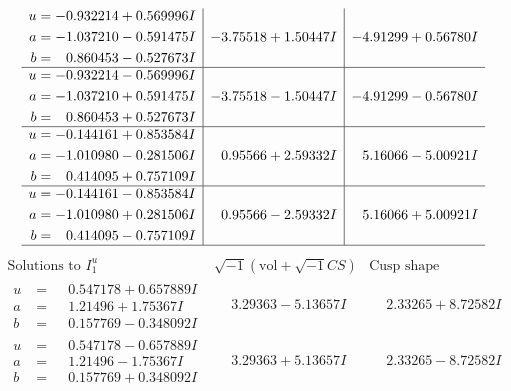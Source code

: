 \documentclass[1p]{elsarticle_modified}
\theoremstyle{definition}
\newcommand{\I}{\sqrt{-1}}
\begin{document}
$$\begin{array}{c|c|c}
\begin{aligned}
u &= -0.932214 + 0.569996 I \\
a &= -1.037210 - 0.591475 I \\
b &= \phantom{-}0.860453 - 0.527673 I\end{aligned}
 & -3.75518 + 1.50447 I & -4.91299 + 0.56780 I \\ \hline\begin{aligned}
u &= -0.932214 - 0.569996 I \\
a &= -1.037210 + 0.591475 I \\
b &= \phantom{-}0.860453 + 0.527673 I\end{aligned}
 & -3.75518 - 1.50447 I & -4.91299 - 0.56780 I \\ \hline\begin{aligned}
u &= -0.144161 + 0.853584 I \\
a &= -1.010980 - 0.281506 I \\
b &= \phantom{-}0.414095 + 0.757109 I\end{aligned}
 & \phantom{-}0.95566 + 2.59332 I & \phantom{-}5.16066 - 5.00921 I \\ \hline\begin{aligned}
u &= -0.144161 - 0.853584 I \\
a &= -1.010980 + 0.281506 I \\
b &= \phantom{-}0.414095 - 0.757109 I\end{aligned}
 & \phantom{-}0.95566 - 2.59332 I & \phantom{-}5.16066 + 5.00921 I\\
 \hline 
 \end{array}$$\newpage$$\begin{array}{c|c|c}  
\text{Solutions to }I^u_{1}& \I (\text{vol} + \sqrt{-1}CS) & \text{Cusp shape}\\
 \hline 
\begin{aligned}
u &= \phantom{-}0.547178 + 0.657889 I \\
a &= \phantom{-}1.21496 + 1.75367 I \\
b &= \phantom{-}0.157769 - 0.348092 I\end{aligned}
 & \phantom{-}3.29363 - 5.13657 I & \phantom{-}2.33265 + 8.72582 I \\ \hline\begin{aligned}
u &= \phantom{-}0.547178 - 0.657889 I \\
a &= \phantom{-}1.21496 - 1.75367 I \\
b &= \phantom{-}0.157769 + 0.348092 I\end{aligned}
 & \phantom{-}3.29363 + 5.13657 I & \phantom{-}2.33265 - 8.72582 I \\ \hline\begin{aligned}

\end{aligned}
\end{array}$$
\end{document}
